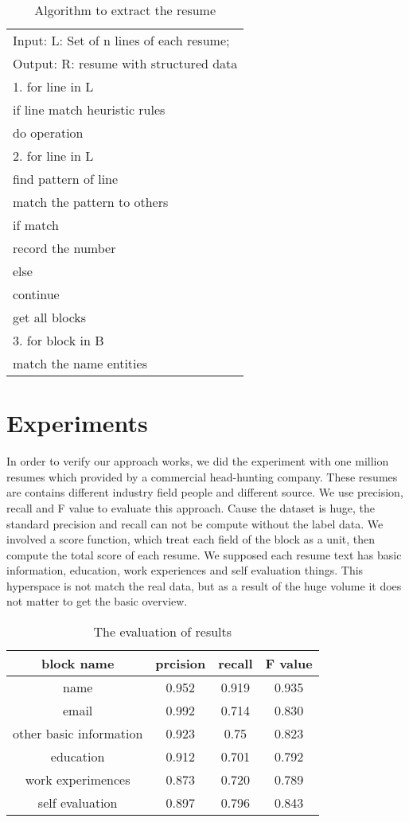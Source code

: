 \documentclass{acm_proc_article-sp}
\begin{document}
\begin{table}
\centering
\caption{Algorithm to extract the resume}
\begin{tabular}{|l|} \hline
Input: L: Set of n lines of each resume;\\
Output: R: resume with structured data \\ \hline
1. for line in L\\
	if line match heuristic rules\\
		do operation\\
2. for line in L\\
	find pattern of line\\
	match the pattern to others\\
	if match\\
		record the number\\
	else\\
		continue\\
	get all blocks\\
3. for block in B\\
	match the name entities\\
\hline
\end{tabular}
\end{table}

\section{Experiments}

In order to verify our approach works, we did the experiment with one million resumes which provided by a commercial head-hunting company. 
These resumes are contains different industry field people and different source.
We use precision, recall and F value to evaluate this approach.
Cause the dataset is huge, the standard precision and recall can not be compute without the label data.
We involved a score function, which treat each field of the block as a unit, then compute the total score of each resume.
We supposed each resume text has basic information, education, work experiences and self evaluation things.
This hyperspace is not match the real data, but as a result of the huge volume it does not matter to get the basic overview.

\begin{table}
\centering
\caption{The evaluation of results}
\begin{tabular}{|c|c|c|c|} \hline
block name & prcision & recall & F value\\ \hline
name & 0.952 & 0.919 & 0.935 \\ \hline
email & 0.992 & 0.714 &0.830 \\  \hline
other basic information & 0.923 & 0.75 & 0.823 \\ \hline
education & 0.912 & 0.701 & 0.792\\ \hline
work experimences & 0.873  & 0.720 & 0.789 \\ \hline
self evaluation & 0.897  &0.796 &0.843 \\
\hline\end{tabular}
\end{table}
\end{document}
